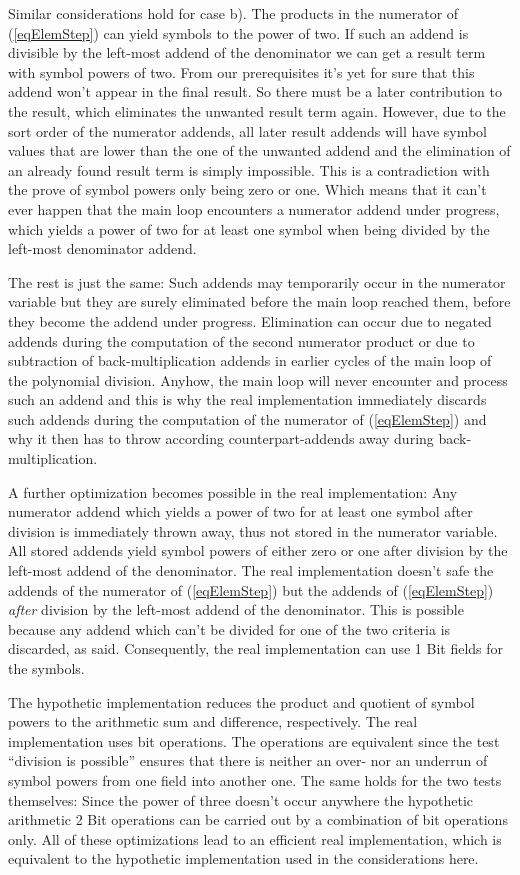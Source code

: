 Similar considerations hold for case b). The products in the numerator of
(\ref{eqElemStep}) can yield symbols to the power of two. If such an
addend is divisible by the left-most addend of the denominator we can get
a result term with symbol powers of two. From our prerequisites it's yet
for sure that this addend won't appear in the final result. So there must
be a later contribution to the result, which eliminates the unwanted
result term again. However, due to the sort order of the numerator
addends, all later result addends will have symbol values that are lower
than the one of the unwanted addend and the elimination of an already
found result term is simply impossible. This is a contradiction with the
prove of symbol powers only being zero or one. Which means that it can't
ever happen that the main loop encounters a numerator addend under
progress, which yields a power of two for at least one symbol when being
divided by the left-most denominator addend.

The rest is just the same: Such addends may temporarily occur in the
numerator variable but they are surely eliminated before the main loop
reached them, before they become the addend under progress. Elimination
can occur due to negated addends during the computation of the second
numerator product or due to subtraction of back-multiplication addends in
earlier cycles of the main loop of the polynomial division. Anyhow, the
main loop will never encounter and process such an addend and this is why
the real implementation immediately discards such addends during the
computation of the numerator of (\ref{eqElemStep}) and why it then has to
throw according counterpart-addends away during back-multiplication.

A further optimization becomes possible in the real implementation: Any
numerator addend which yields a power of two for at least one symbol after
division is immediately thrown away, thus not stored in the numerator
variable. All stored addends yield symbol powers of either zero or one
after division by the left-most addend of the denominator. The real
implementation doesn't safe the addends of the numerator of
(\ref{eqElemStep}) but the addends of (\ref{eqElemStep}) \emph{after}
division by the left-most addend of the denominator. This is possible
because any addend which can't be divided for one of the two criteria is
discarded, as said. Consequently, the real implementation can use 1 Bit
fields for the symbols.

The hypothetic implementation reduces the product and quotient of symbol
powers to the arithmetic sum and difference, respectively. The real
implementation uses bit operations. The operations are equivalent since
the test ``division is possible'' ensures that there is neither an over- nor
an underrun of symbol powers from one field into another one. The same
holds for the two tests themselves: Since the power of three doesn't occur
anywhere the hypothetic arithmetic 2 Bit operations can be carried out by
a combination of bit operations only. All of these optimizations lead to
an efficient real implementation, which is equivalent to the hypothetic
implementation used in the considerations here.


